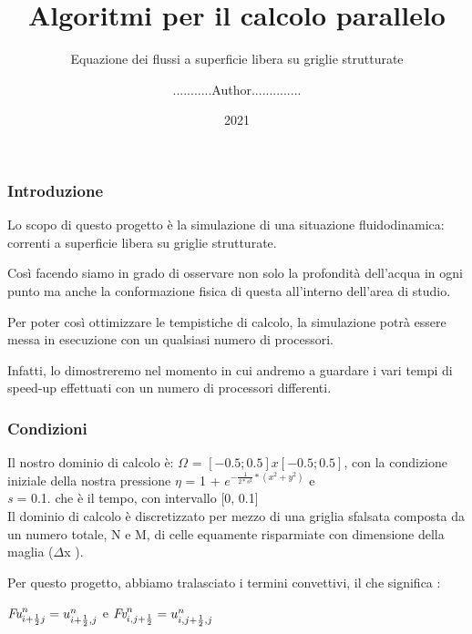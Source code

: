 \documentclass{beamer}
\title{Algoritmi per il calcolo parallelo}
\author{...........Author..............}
\date{2021}
\subtitle{Equazione dei flussi a superficie libera su griglie strutturate}
\begin{document}
	\frame{\titlepage}
	
	\begin{frame}
		\frametitle{Introduzione}
		Lo scopo di questo progetto è la simulazione di una situazione fluidodinamica: correnti a superficie libera su griglie strutturate.
		\medskip
	
		Così facendo siamo in grado di osservare non solo la profondità dell'acqua in ogni punto ma anche la conformazione fisica di questa all'interno dell'area di studio. 
		
		\medskip
		Per poter così ottimizzare le tempistiche di calcolo, la simulazione potrà essere messa in esecuzione con un qualsiasi numero di processori.
		
		\smallskip
		
		Infatti, lo dimostreremo nel momento in cui andremo a guardare i vari tempi di speed-up effettuati con un numero di processori differenti.
	
	\end{frame}

	\begin{frame}
		\frametitle{Condizioni}

		Il nostro dominio di calcolo è: $\Omega$ = $ [ -0.5; 0.5 ] x [ -0.5; 0.5 ]	$, con la condizione iniziale della nostra pressione $\eta$ =  1 + $e^{ -\frac{1}{2* s^{2}} * (x^{2} + y^{2})} $ e \\ \emph{s} = 0.1. che è il tempo, con intervallo [0, 0.1]\\
		
		
		Il dominio di calcolo è discretizzato per mezzo di una griglia sfalsata composta da un numero totale, N e M, di celle equamente risparmiate con dimensione della maglia ($\Delta$x ).
			
		Per questo progetto, abbiamo tralasciato i termini convettivi, il che significa : 
			\begin{center}
			
			$ \emph{Fu}_{i + \frac{1}{2} j}^{n} = u_{i+\frac{1}{2},j}^{n}	$ e $\emph{Fv}_{i,j + \frac{1}{2}} ^{n}	= u_{i, j +\frac{1}{2},j}^{n}	$
			
			\end{center}	
   	\end{frame}
\end{document}
